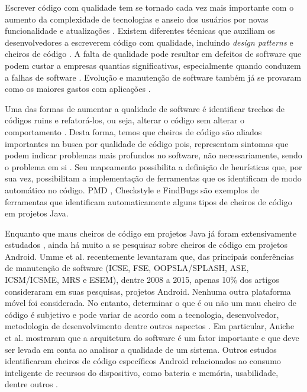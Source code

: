 Escrever código com qualidade tem se tornado cada vez mais importante com o aumento da complexidade de tecnologias e anseio dos usuários por novas funcionalidade e atualizações \cite{Hecht2015,MobileSmells:13}. Existem diferentes técnicas que auxiliam os desenvolvedores a escreverem código com qualidade, incluindo \textit{design patterns} \cite{gof} e cheiros de código \cite{Refactoring:99}. A falta de qualidade pode resultar em defeitos de software que podem custar a empresas quantias significativas, especialmente quando conduzem a falhas de software \cite{Nagappan:2005, briand1993modeling}. Evolução e manutenção de software também já se provaram como os maiores gastos com aplicações \cite{RefactoringAndImprovements:10}.

Uma das formas de aumentar a qualidade de software é identificar trechos de códigos ruins e refatorá-los, ou seja, alterar o código sem alterar o comportamento \cite{Refactoring:99}. Desta forma, temos que cheiros de código são aliados importantes na busca por qualidade de código pois, representam sintomas que podem indicar problemas mais profundos no software, não necessariamente, sendo o problema em si \cite{CodeSmell:06}. Seu mapeamento possibilita a definição de heurísticas que, por sua vez, possibilitam a implementação de ferramentas que os identificam de modo automático no código. PMD \cite{PMD2016}, Checkstyle e FindBugs são exemplos de ferramentas que identificam automaticamente alguns tipos de cheiros de código em projetos Java.


Enquanto que maus cheiros de código em projetos Java já foram extensivamente estudados \cite{Riel, Refactoring:99, Martin:2008:CCH:1388398}, ainda há muito a se pesquisar sobre cheiros de código em projetos Android.
Umme et al. \cite{Mannan_Dig_Ahmed_Jensen_Abdullah_Almurshed} recentemente levantaram que, das principais conferências de manutenção de software (ICSE, FSE, OOPSLA/SPLASH, ASE, ICSM/ICSME, MRS e ESEM), dentre 2008 a 2015, apenas 10\% dos artigos consideraram em suas pesquisas, projetos Android. Nenhuma outra plataforma móvel foi considerada.  
No entanto, determinar o que é ou não um mau cheiro de código é subjetivo e pode variar de acordo com a tecnologia, desenvolvedor, metodologia de desenvolvimento dentre outros aspectos \cite{WikiCodeSmell}. Em particular, Aniche et al. \cite{MvcSmells:16,aniche2016satt} mostraram que a arquitetura do software é um fator importante e que deve ser levada em conta ao analisar a qualidade de um sistema.
Outros estudos identificaram cheiros de código específicos Android relacionados ao consumo inteligente de recursos do dispositivo, como bateria e memória, usabilidade, dentre outros \cite{EnergyAndroidSmells, ReimannBrylski2013}. 

